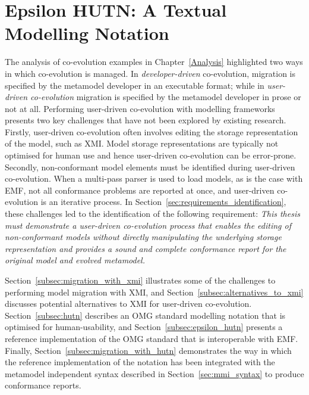 
\section{Epsilon HUTN: A Textual Modelling Notation}
\label{sec:notation}
The analysis of co-evolution examples in Chapter~\ref{Analysis} highlighted two ways in which co-evolution is managed. In \emph{developer-driven} co-evolution, migration is specified by the metamodel developer in an executable format; while in \emph{user-driven co-evolution} migration is specified by the metamodel developer in prose or not at all. Performing user-driven co-evolution with modelling frameworks presents two key challenges that have not been explored by existing research. Firstly, user-driven co-evolution often involves editing the storage representation of the model, such as XMI. Model storage representations are typically not optimised for human use and hence user-driven co-evolution can be error-prone. Secondly, non-conformant model elements must be identified during user-driven co-evolution. When a multi-pass parser is used to load models, as is the case with EMF, not all conformance problems are reported at once, and user-driven co-evolution is an iterative process. In Section~\ref{sec:requirements_identification}, these challenges led to the identification of the following requirement: \emph{This thesis must demonstrate a user-driven co-evolution process that enables the editing of non-conformant models without directly manipulating the underlying storage representation and provides a sound and complete conformance report for the original model and evolved metamodel.}

Section~\ref{subsec:migration_with_xmi} illustrates some of the challenges to performing model migration with XMI, and Section~\ref{subsec:alternatives_to_xmi} discusses potential alternatives to XMI for user-driven co-evolution. Section~\ref{subsec:hutn} describes an OMG standard modelling notation that is optimised for human-usability, and Section~\ref{subsec:epsilon_hutn} presents a reference implementation of the OMG standard that is interoperable with EMF. Finally, Section~\ref{subsec:migration_with_hutn} demonstrates the way in which the reference implementation of the notation has been integrated with the metamodel independent syntax described in Section~\ref{sec:mmi_syntax} to produce conformance reports. 

